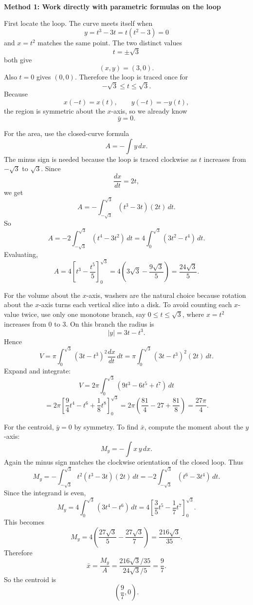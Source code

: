 \documentclass[a4paper,12pt,twocolumn]{article}
\newenvironment{solutionbox}{\begin{framed}}{\end{framed}}
\begin{document}
\begin{solutionbox}
\textbf{Method 1: Work directly with parametric formulas on the loop}

\begin{steps}
\item First locate the loop. The curve meets itself when
\[
y=t^3-3t=t(t^2-3)=0
\]
and \(x=t^2\) matches the same point. The two distinct values
\[
t=\pm\sqrt3
\]
both give
\[
(x,y)=(3,0).
\]
Also \(t=0\) gives \((0,0)\). Therefore the loop is traced once for
\[
-\sqrt3\le t\le\sqrt3.
\]
Because
\[
x(-t)=x(t),
\qquad
y(-t)=-y(t),
\]
the region is symmetric about the \(x\)-axis, so we already know
\[
\bar y=0.
\]

\item For the area, use the closed-curve formula
\[
A=-\int y\,dx.
\]
The minus sign is needed because the loop is traced clockwise as \(t\) increases from \(-\sqrt3\) to \(\sqrt3\). Since
\[
\frac{dx}{dt}=2t,
\]
we get
\[
A=-\int_{-\sqrt3}^{\sqrt3}(t^3-3t)(2t)\,dt.
\]
So
\[
A=-2\int_{-\sqrt3}^{\sqrt3}(t^4-3t^2)\,dt
=4\int_0^{\sqrt3}(3t^2-t^4)\,dt.
\]
Evaluating,
\[
A=4\left[t^3-\frac{t^5}{5}\right]_0^{\sqrt3}
=4\left(3\sqrt3-\frac{9\sqrt3}{5}\right)
=\frac{24\sqrt3}{5}.
\]

\item For the volume about the \(x\)-axis, washers are the natural choice because rotation about the \(x\)-axis turns each vertical slice into a disk. To avoid counting each \(x\)-value twice, use only one monotone branch, say \(0\le t\le\sqrt3\), where \(x=t^2\) increases from \(0\) to \(3\). On this branch the radius is
\[
|y|=3t-t^3.
\]
Hence
\[
V=\pi\int_0^{\sqrt3}(3t-t^3)^2\frac{dx}{dt}\,dt
=\pi\int_0^{\sqrt3}(3t-t^3)^2(2t)\,dt.
\]
Expand and integrate:
\[
V=2\pi\int_0^{\sqrt3}(9t^3-6t^5+t^7)\,dt
\]
\[
=2\pi\left[\frac{9}{4}t^4-t^6+\frac18 t^8\right]_0^{\sqrt3}
=2\pi\left(\frac{81}{4}-27+\frac{81}{8}\right)
=\frac{27\pi}{4}.
\]

\item For the centroid, \(\bar y=0\) by symmetry. To find \(\bar x\), compute the moment about the \(y\)-axis:
\[
M_y=-\int x\,y\,dx.
\]
Again the minus sign matches the clockwise orientation of the closed loop. Thus
\[
M_y=-\int_{-\sqrt3}^{\sqrt3}t^2(t^3-3t)(2t)\,dt
=-2\int_{-\sqrt3}^{\sqrt3}(t^6-3t^4)\,dt.
\]
Since the integrand is even,
\[
M_y=4\int_0^{\sqrt3}(3t^4-t^6)\,dt
=4\left[\frac35 t^5-\frac17 t^7\right]_0^{\sqrt3}.
\]
This becomes
\[
M_y=4\left(\frac{27\sqrt3}{5}-\frac{27\sqrt3}{7}\right)
=\frac{216\sqrt3}{35}.
\]
Therefore
\[
\bar x=\frac{M_y}{A}
=\frac{216\sqrt3/35}{24\sqrt3/5}
=\frac97.
\]
So the centroid is
\[
\left(\frac97,0\right).
\]
\end{steps}
\end{solutionbox}
\end{document}
